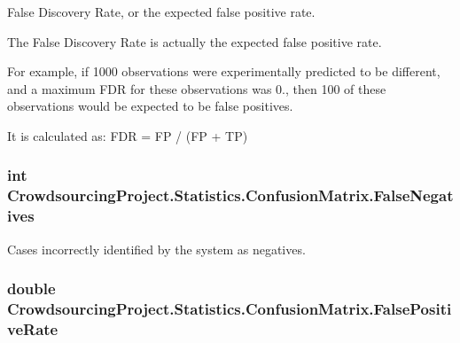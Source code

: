 False Discovery Rate, or the expected false positive rate. 

The False Discovery Rate is actually the expected false positive rate.

For example, if 1000 observations were experimentally predicted to be different, and a maximum F\+D\+R for these observations was 0., then 100 of these observations would be expected to be false positives.

It is calculated as\+: F\+D\+R = F\+P / (F\+P + T\+P) \hypertarget{class_crowdsourcing_project_1_1_statistics_1_1_confusion_matrix_a6e681408fc24887a2f64f711de077fe6}{}
\subsubsection[{False\+Negatives}]{\setlength{\rightskip}{0pt plus 5cm}int Crowdsourcing\+Project.\+Statistics.\+Confusion\+Matrix.\+False\+Negatives\hspace{0.3cm}{\ttfamily [get]}}\label{class_crowdsourcing_project_1_1_statistics_1_1_confusion_matrix_a6e681408fc24887a2f64f711de077fe6}


Cases incorrectly identified by the system as negatives. 

\hypertarget{class_crowdsourcing_project_1_1_statistics_1_1_confusion_matrix_a883fcaefecb1086c5931cd870c2ef4b1}{}
\subsubsection[{False\+Positive\+Rate}]{\setlength{\rightskip}{0pt plus 5cm}double Crowdsourcing\+Project.\+Statistics.\+Confusion\+Matrix.\+False\+Positive\+Rate\hspace{0.3cm}{\ttfamily [get]}}\label{class_crowdsourcing_project_1_1_statistics_1_1_confusion_matrix_a883fcaefecb1086c5931cd870c2ef4b1}



